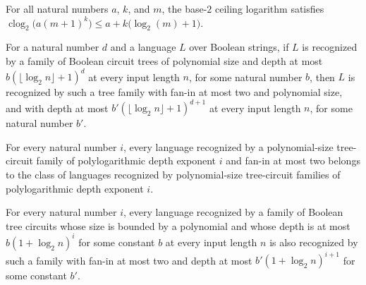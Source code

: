 \begin{theorem}
\label{BoolCircuit.clog_poly_le}
\leanok
{}
For all natural numbers $a$, $k$, and $m$, the base-$2$ ceiling logarithm satisfies
$\operatorname{clog}_2\!\bigl(a(m+1)^k\bigr)\le
a+k\bigl(\operatorname{log}_2(m)+1\bigr)$.
\end{theorem}

\begin{theorem}
\label{Language.InTreeAC.inTreeNC_succ}
\leanok
{}
For a natural number $d$ and a language $L$ over Boolean strings, if $L$ is recognized
by a family of Boolean circuit trees of polynomial size and depth at most
$b(\lfloor\log_2 n\rfloor+1)^d$ at every input length $n$, for some natural number $b$,
then $L$ is recognized by such a tree family with fan-in at most two and polynomial
size, and with depth at most $b'(\lfloor\log_2 n\rfloor+1)^{d+1}$ at every input length
$n$, for some natural number $b'$.
\end{theorem}

\begin{theorem}
\label{BoolCircuit.TreeNCLevel_subset_ACLevel}
\leanok
{}
For every natural number $i$, every language recognized by a polynomial-size
tree-circuit family of polylogarithmic depth exponent $i$ and fan-in at most two belongs
to the class of languages recognized by polynomial-size tree-circuit families of
polylogarithmic depth exponent $i$.
\end{theorem}

\begin{theorem}
\label{BoolCircuit.TreeACLevel_subset_NCLevel_succ}
\leanok
{}
For every natural number $i$, every language recognized by a family of Boolean tree
circuits whose size is bounded by a polynomial and whose depth is at most $b(1+\log_2
n)^i$ for some constant $b$ at every input length $n$ is also recognized by such a
family with fan-in at most two and depth at most $b'(1+\log_2 n)^{i+1}$ for some
constant $b'$.
\end{theorem}

